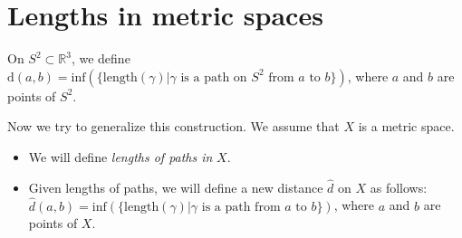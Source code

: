 \section{Lengths in metric spaces}
On $S^2 \subset \mathbb{R}^3$, we define $\mathrm{d}(a,b) = \text{inf}\left( \{ \text{length}(\gamma) | \gamma \text{ is a path on } S^2 \text{ from } a \text{ to } b \} \right)$, where $a$ and $b$ are points of $S^2$.

Now we try to generalize this construction. We assume that $X$ is a metric space.
\begin{itemize}
\item We will define \emph{lengths of paths in} $X$.
\item Given lengths of paths, we will define a new distance $\hat{d}$ on $X$ as follows: $\hat{d}(a,b) = \text{inf}\left( \{ \text{length}(\gamma) | \gamma \text{ is a path from } a \text{ to } b \} \right)$, where $a$ and $b$ are points of $X$. 
\end{itemize}